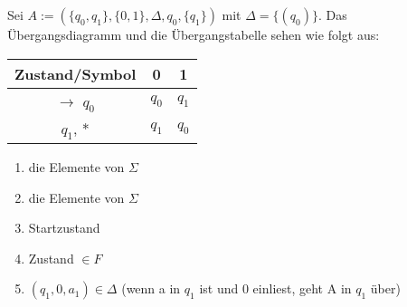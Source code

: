 \newpage
{}
    Sei \(A := (\{q_{0}, q_{1}\}, \{0, 1\}, \Delta, q_{0}, \{q_{1}\})\) mit \(\Delta = \{(q_{0})\}\). Das Übergangsdiagramm und die Übergangstabelle sehen wie folgt aus:

    \begin{center}
        \begin{tabular}{|c|c|c|}
            \hline
            \textbf{Zustand/Symbol} & \textbf{0} \footnotemark[1] & \textbf{1} \footnotemark[2] \\
            \hline
            \( \rightarrow\) \footnotemark[3] \(q_{0}\) & \(q_{0}\) & \(q_{1}\) \\
            \hline
            \(q_{1}\), * \footnotemark[4] & \(q_{1}\) \footnotemark[5] & \(q_{0}\) \\
            \hline
        \end{tabular}
    \end{center}
    \begin{enumerate}
        \item  die Elemente von \(\Sigma\)
        \item  die Elemente von \(\Sigma\)
        \item  Startzustand
        \item  Zustand \(\in F\)
        \item  \((q_1, 0, a_1) \in \Delta\) (wenn a in \(q_1\) ist und 0 einliest, geht A in \(q_1\) über)
    \end{enumerate}
    {

    }

    \begin{center}
    \end{center}


